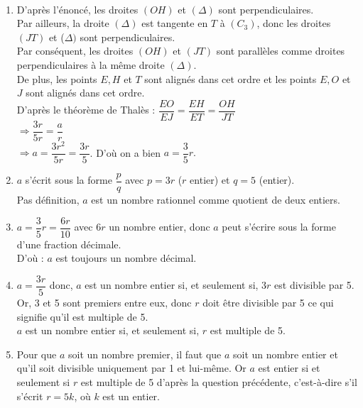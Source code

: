 \ \\ [-5mm]
   \begin{enumerate}
      \item D'après l'énoncé, les droites $(OH)$ et $(\Delta)$ sont perpendiculaires. \\
         Par ailleurs, la droite $(\Delta)$ est tangente en $T$ à $(C_3)$, donc les droites $(JT)$ et ($\Delta)$ sont perpendiculaires. \\
         Par conséquent, les droites $(OH)$ et $(JT)$ sont parallèles comme droites perpendiculaires à la même droite $(\Delta)$. \\
         De plus, les points $E, H$ et $T$ sont alignés dans cet ordre et les points $E, O $ et $J$ sont alignés dans cet ordre. \\
         D'après le théorème de Thalès : $\dfrac{EO}{EJ} =\dfrac{EH}{ET} =\dfrac{OH}{JT}$ \\ [1mm]
         \hspace*{4.2cm} $\Rightarrow \dfrac{3r}{5r} =\dfrac{a}{r}$ \\ [1mm]
         \hspace*{4.3cm} $\Rightarrow a =\dfrac{3r^2}{5r} =\dfrac{3r}{5}$. \quad D'où on a bien {\blue $a =\dfrac35r$.}
      \item $a$ s'écrit sous la forme $\dfrac{p}{q}$ avec $p =3r$ ($r$ entier) et $q =5$ (entier). \\ [1mm]
         Pas définition, {\blue $a$ est un nombre rationnel comme quotient de deux entiers}.
      \item $a =\dfrac35r =\dfrac{6r}{10}$ avec $6r$ un nombre entier, donc $a$ peut s'écrire sous la forme d'une fraction décimale. \\ [1mm]
         D'où : {\blue $a$ est toujours un nombre décimal}.
      \item $a =\dfrac{3r}{5}$ donc, $a$ est un nombre entier si, et seulement si, $3r$ est divisible par 5. \\ [1mm]
         Or, 3 et 5 sont premiers entre eux, donc $r$ doit être divisible par 5 ce qui signifie qu'il est multiple de 5. \\
         {\blue $a$ est un nombre entier si, et seulement si, $r$ est  multiple de 5}.
      \item Pour que $a$ soit un nombre premier, il faut que $a$ soit un nombre entier et qu'il soit divisible uniquement par 1 et lui-même. Or $a$ est entier si et seulement si $r$ est multiple de 5 d'après la question précédente, c'est-à-dire s'il s'écrit $r = 5k$, où $k$ est un entier. \\

\end{enumerate}

